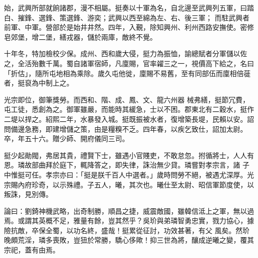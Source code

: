 \begin{pinyinscope}
 始，武興所部就餉諸郡，漫不相屬。挺奏以十軍為名，自北邊至武興列五軍，曰踏白、摧鋒、選鋒、策選鋒、游奕；武興以西至綿為左、右、後三軍；
 而駐武興者前軍、中軍。營部於是始井井然。四年，入覲，除知興州、利州西路安撫使。密修皂郊堡，增二堡，繕戎器，儲於兩庫，敵終不覺。



 十年冬，特加檢校少保。成州、西和歲大侵，挺力為振恤，諭總賦者分軍儲以佐之，全活殆數千萬。蜀自諸軍宿師，凡廩賜，官率糴三之一，視價高下給之，名曰「折估」，隨所屯地相為乘除。歲久屯他徙，廩賜不易舊，至有同部伍而廩相倍蓰者，挺裒為中制上之。



 光宗即位，御筆獎勞。而西和、階、成、鳳、文、龍六州器
 械弗繕，挺節冗費，屯工徒，悉創為之。御軍雖嚴，而能時其緩急，士以不困。郡東北有二穀水，挺作二堤以捍之。紹熙二年，水暴發入城。挺既振被水者，復增築長堤，民賴以安。詔問備邊急務，即建增儲之策，由是糧糗不乏。四年春，以疾乞致仕，詔加太尉。卒，年五十六。贈少師、開府儀同三司。



 挺少起勛閥，弗居其貴，禮賢下士，雖遇小官賤吏，不敢怠忽。拊循將士，人人有恩。璘故部曲拜於庭下，輒降答之，即失律，誅治無少貸。璘嘗對孝宗言，諸
 子中惟挺可任。孝宗亦曰：「挺是朕千百人中選者。」歲時問勞不絕，被遇尤深厚。光宗賜內府珍奇，以示殊禮。子五人，曦，其次也。曦仕至太尉、昭信軍節度使，以叛誅，見別傳。



 論曰：劉錡神機武略，出奇制勝，順昌之捷，威震敵國，雖韓信泜上之軍，無以過焉。或謂其英概不足，雅量有餘，豈其然乎？吳玠與弟璘智勇忠實，戮力協心，據險抗敵，卒保全蜀，以功名終，盛哉！挺累從征討，功效甚著，有父
 風矣。然玠晚頗荒淫，璘多喪敗，豈狃於常勝，驕心侈歟！抑三世為將，釀成逆曦之變，覆其宗祀，蓋有由焉。



\end{pinyinscope}